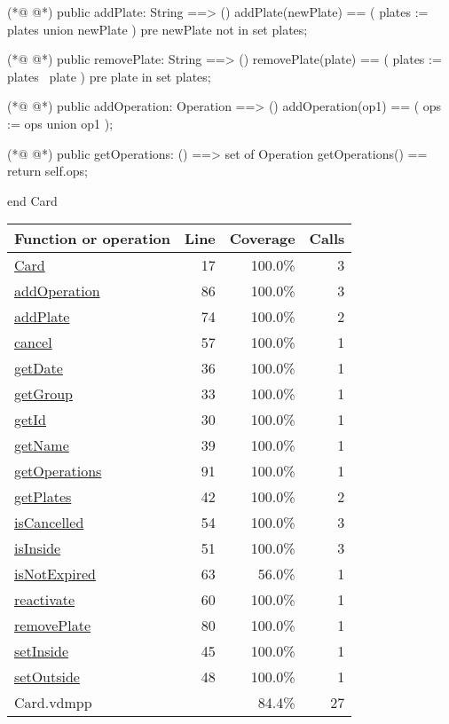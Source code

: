 \begin{vdmpp}[breaklines=true]
 
(*@
\label{addPlate:74}
@*)
public addPlate: String ==> ()
 addPlate(newPlate) == (
  plates := plates union {newPlate}
 )
 pre newPlate not in set plates;

(*@
\label{removePlate:80}
@*)
public removePlate: String ==> ()
 removePlate(plate) == (
  plates := plates \ {plate}
 )
 pre plate in set plates;
 
(*@
\label{addOperation:86}
@*)
public addOperation: Operation ==> ()
 addOperation(op1) == (
  ops := ops union {op1}
 );
 
(*@
\label{getOperations:91}
@*)
public getOperations: () ==> set of Operation
 getOperations() == return self.ops;
 
end Card
\end{vdmpp}
\bigskip
\begin{longtable}{|l|r|r|r|}
\hline
Function or operation & Line & Coverage & Calls \\
\hline
\hline
\hyperref[Card:17]{Card} & 17&100.0\% & 3 \\
\hline
\hyperref[addOperation:86]{addOperation} & 86&100.0\% & 3 \\
\hline
\hyperref[addPlate:74]{addPlate} & 74&100.0\% & 2 \\
\hline
\hyperref[cancel:57]{cancel} & 57&100.0\% & 1 \\
\hline
\hyperref[getDate:36]{getDate} & 36&100.0\% & 1 \\
\hline
\hyperref[getGroup:33]{getGroup} & 33&100.0\% & 1 \\
\hline
\hyperref[getId:30]{getId} & 30&100.0\% & 1 \\
\hline
\hyperref[getName:39]{getName} & 39&100.0\% & 1 \\
\hline
\hyperref[getOperations:91]{getOperations} & 91&100.0\% & 1 \\
\hline
\hyperref[getPlates:42]{getPlates} & 42&100.0\% & 2 \\
\hline
\hyperref[isCancelled:54]{isCancelled} & 54&100.0\% & 3 \\
\hline
\hyperref[isInside:51]{isInside} & 51&100.0\% & 3 \\
\hline
\hyperref[isNotExpired:63]{isNotExpired} & 63&56.0\% & 1 \\
\hline
\hyperref[reactivate:60]{reactivate} & 60&100.0\% & 1 \\
\hline
\hyperref[removePlate:80]{removePlate} & 80&100.0\% & 1 \\
\hline
\hyperref[setInside:45]{setInside} & 45&100.0\% & 1 \\
\hline
\hyperref[setOutside:48]{setOutside} & 48&100.0\% & 1 \\
\hline
\hline
Card.vdmpp & & 84.4\% & 27 \\
\hline
\end{longtable}

